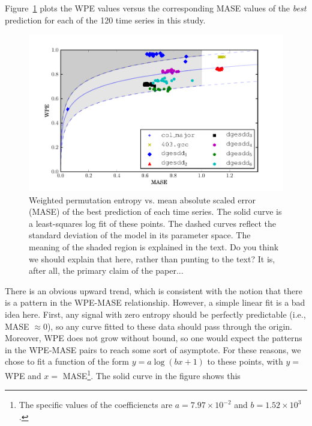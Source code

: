 Figure~\ref{fig:wpe_vs_mase_best} plots the WPE values versus the
corresponding MASE values of the \emph{best} prediction for each of
the 120 time series in this study.
\begin{figure}
  \centering
  \includegraphics[width=1.1\columnwidth]{figs/new_prediction_vs_entropy}
  \caption{Weighted permutation entropy vs. mean absolute scaled error
    (MASE) of the best prediction of each time series.  The solid
    curve is a least-squares log fit of these points.
%
%
The dashed curves reflect the standard deviation of the model in its
parameter space.  The meaning of the shaded region is explained in the
text. \alert{Do you think we should explain that here, rather than
  punting to the text?  It is, after all, the primary claim of the
  paper...}}
  \label{fig:wpe_vs_mase_best}
\end{figure}
%
%
There is an obvious upward trend, which is consistent with the notion
that there is a pattern in the WPE-MASE relationship.  However, a
simple linear fit is a bad idea here.  First, any signal with zero
entropy should be perfectly predictable (i.e., MASE $\approx 0$), so
any curve fitted to these data should pass through the origin.
Moreover, WPE does not grow without bound, so one would expect the
patterns in the WPE-MASE pairs to reach some sort of asymptote.  For
these reasons, we chose to fit a function of the form $y = a \log(b x
+ 1)$ to these points, with $y =$ WPE and $x=$ MASE\footnote{The
  specific values of the coefficiencts are $a=7.97 \times 10^{-2}$ and
  $b=1.52 \times 10^3$.}.  The solid curve in the figure shows this
